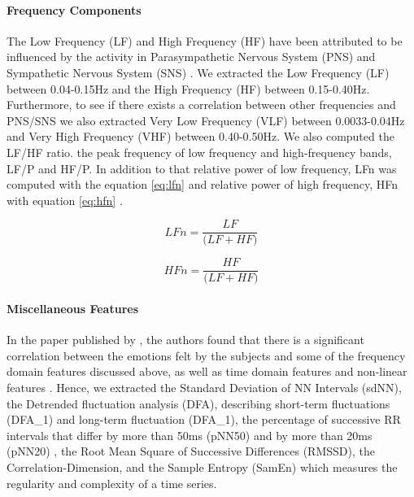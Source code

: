 \paragraph{Frequency Components} The Low Frequency (LF) and High Frequency (HF) have been attributed to be influenced by the activity in Parasympathetic Nervous System (PNS) and Sympathetic Nervous System (SNS) \cite{noauthor_heart_1996} \cite{berntson_gary:1997}. We extracted the Low Frequency (LF) between 0.04-0.15Hz and the High Frequency (HF) between 0.15-0.40Hz. Furthermore, to see if there exists a correlation between other frequencies and PNS/SNS we also extracted Very Low Frequency (VLF) between 0.0033-0.04Hz and Very High Frequency (VHF) between 0.40-0.50Hz. We also computed the LF/HF ratio. the peak frequency of low frequency and high-frequency bands, LF/P and HF/P. In addition to that relative power of low frequency, LFn was computed with the equation \ref{eq:lfn} and relative power of high frequency, HFn with equation \ref{eq:hfn} \cite{shaffer_overview_2017}. 

\begin{equation}
\label{eq:lfn}
    LFn = \frac{LF}{\big(LF + HF)}
\end{equation}

\begin{equation}
\label{eq:hfn}
    HFn = \frac{HF}{\big(LF + HF)}
\end{equation}

\paragraph{Miscellaneous Features} In the paper published by \citeauthor{zhao_emotion_2016}, the authors found that there is a significant correlation between the emotions felt by the subjects and some of the frequency domain features discussed above, as well as time domain features and non-linear features \cite{zhao_emotion_2016}. Hence, we extracted the Standard Deviation of NN Intervals (sdNN), the Detrended fluctuation analysis (DFA), describing short-term fluctuations (DFA\_1) and long-term fluctuation (DFA\_1), the percentage of successive RR intervals that differ by more than 50ms (pNN50) and by more than 20ms (pNN20)  \cite{pend1995},  the Root Mean Square of Successive Differences (RMSSD), the Correlation-Dimension, and the Sample Entropy (SamEn) which measures the regularity and complexity of a time series. 

